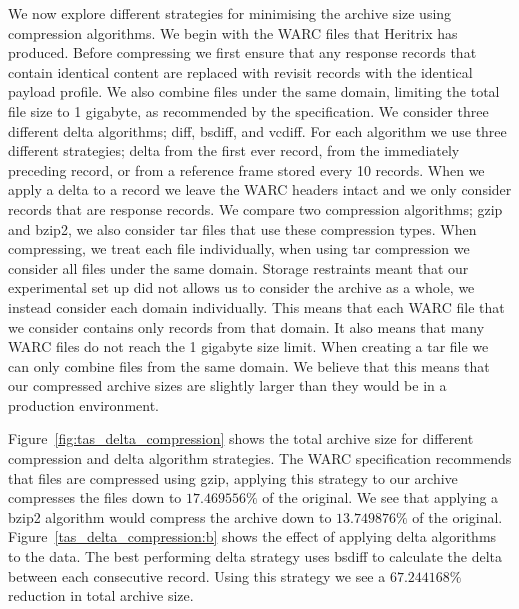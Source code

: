 \documentclass[11pt]{article}
\begin{document}
We now explore different strategies for minimising the archive size using compression algorithms. We begin with the WARC files that Heritrix has produced. Before compressing we first ensure that any response records that contain identical content are replaced with revisit records with the identical payload profile. We also combine files under the same domain, limiting the total file size to 1 gigabyte, as recommended by the specification. We consider three different delta algorithms; diff, bsdiff, and vcdiff. For each algorithm we use three different strategies; delta from the first ever record, from the immediately preceding record, or from a reference frame stored every 10 records. When we apply a delta to a record we leave the WARC headers intact and we only consider records that are response records. We compare two compression algorithms; gzip and bzip2, we also consider tar files that use these compression types. When compressing, we treat each file individually, when using tar compression we consider all files under the same domain. Storage restraints meant that our experimental set up did not allows us to consider the archive as a whole, we instead consider each domain individually. This means that each WARC file that we consider contains only records from that domain. It also means that many WARC files do not reach the 1 gigabyte size limit. When creating a tar file we can only combine files from the same domain. We believe that this means that our compressed archive sizes are slightly larger than they would be in a production environment.

Figure~\ref{fig:tas_delta_compression} shows the total archive size for different compression and delta algorithm strategies. The WARC specification recommends that files are compressed using gzip, applying this strategy to our archive compresses the files down to $17.469556\%$ of the original. We see that applying a bzip2 algorithm would compress the archive down to $13.749876\%$ of the original. Figure~\ref{tas_delta_compression:b} shows the effect of applying delta algorithms to the data. The best performing delta strategy uses bsdiff to calculate the delta between each consecutive record. Using this strategy we see a $67.244168\%$ reduction in total archive size.
\end{document}
